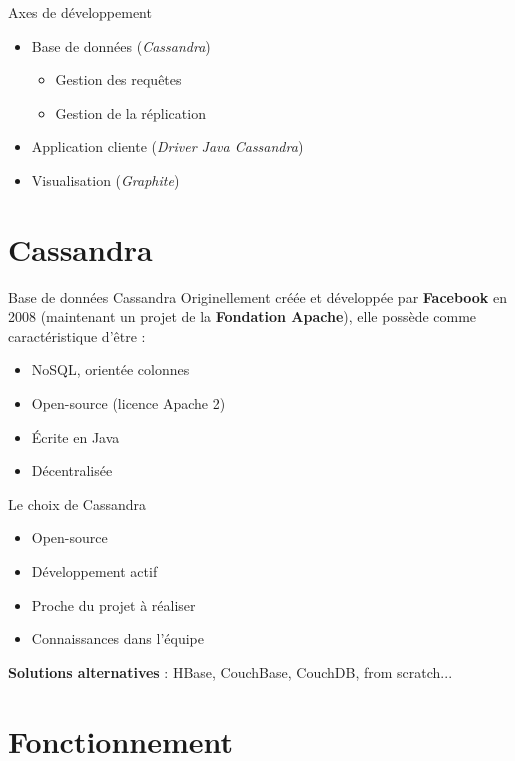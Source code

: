 \documentclass{beamer}
\begin{document}
\begin{frame}{Axes de développement}
\begin{itemize}
	\item Base de données (\textit{Cassandra})
	\begin{itemize}
		\item Gestion des requêtes
		\item Gestion de la réplication
	\end{itemize}
	\item Application cliente (\textit{Driver Java Cassandra})
	\item Visualisation (\textit{Graphite})
\end{itemize}
\end{frame}


\section{Cassandra}

\begin{frame}{Base de données Cassandra}
Originellement créée et développée par \textbf{Facebook} en 2008 (maintenant un projet de la \textbf{Fondation Apache}), elle possède comme caractéristique d'être :
\begin{itemize}
	\item NoSQL, orientée colonnes
	\item Open-source (licence Apache 2)
	\item Écrite en Java
	\item Décentralisée
\end{itemize}
\end{frame}

\begin{frame}{Le choix de Cassandra}
\begin{itemize}
	\item Open-source
	\item Développement actif
	\item Proche du projet à réaliser
	\item Connaissances dans l'équipe
\end{itemize}
\textbf{Solutions alternatives} : HBase, CouchBase, CouchDB, from scratch...
\end{frame}

\section{Fonctionnement}
\end{document}
